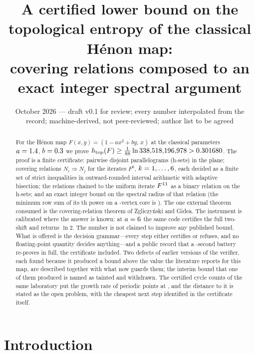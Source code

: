 \documentclass[11pt]{article}
\title{A certified lower bound on the topological entropy of the classical H\'enon map:\\
covering relations composed to an exact integer spectral argument}
\author{\cmauthor}
\date{October 2026 --- draft v0.1 for review; every number interpolated from the record; machine-derived, not peer-reviewed; author list to be agreed}
\newcommand{\htop}{h_{\mathrm{top}}}
\begin{document}
\maketitle

\begin{abstract}
For the H\'enon map $F(x,y)=(1-ax^2+by,\,x)$ at the classical parameters $a=1.4$, $b=0.3$ we prove
$\htop(F)\ge\ExactBound>\HLB$. The proof is a finite certificate: \NBoxes{} pairwise disjoint parallelograms
(h-sets) in the plane; \NEdges{} covering relations $N_i\Rightarrow N_j$ for the iterates $F^k$, $k=1,\dots,6$,
each decided as a finite set of strict inequalities in outward-rounded interval arithmetic with adaptive bisection;
the relations chained to the uniform iterate $F^{11}$ as a binary relation on the h-sets; and an exact
integer bound on the spectral radius of that relation (the minimum row sum of its \PowerM{}th power on a
\CoreSize-vertex core is \MinRowSum). The one external theorem consumed is the covering-relation theorem of
Zgliczy\'nski and Gidea. The instrument is calibrated where the answer is known: at $a=6$ the same code
certifies the full two-shift and returns $\ln 2$. The number is not claimed to improve any published bound. What
is offered is the decision grammar---every step either certifies or refuses, and no floating-point quantity decides
anything---and a public record that a \BatterySeconds-second battery re-proves in full, the certificate included.
Two defects of earlier versions of the verifier, each found because it produced a bound above the value the
literature reports for this map, are described together with what now guards them; the interim bound
\TaintedBound{} that one of them produced is named as tainted and withdrawn. The certified cycle counts of the same
laboratory put the growth rate of periodic points at \Ceiling, and the distance to it is stated as the open problem,
with the cheapest next step identified in the certificate itself.
\end{abstract}

\section{Introduction}
\end{document}
